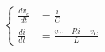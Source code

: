 \documentclass[preview]{standalone}
\begin{document}
\begin{center}
\[
                    \left\{
                    \begin{aligned}
                        \frac{dv_c}{dt} &= \frac{i}{C} \\
                        \frac{di}{dt} &= \frac{v_T -Ri - v_C}{L}
                    \end{aligned}
                    \right.
                    \]
\end{center}
\end{document}
